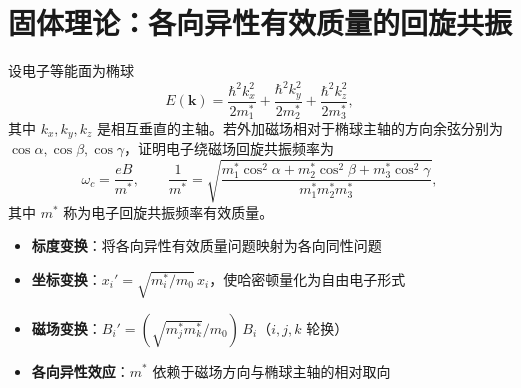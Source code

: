 \section{固体理论：各向异性有效质量的回旋共振}
\label{sec:anisotropic-cyclotron}

\begin{modelbox}[题目：椭球等能面的回旋共振有效质量]
设电子等能面为椭球
\[
E(\bm{k})=\frac{\hbar^2k_x^2}{2m_1^*}+\frac{\hbar^2k_y^2}{2m_2^*}+\frac{\hbar^2k_z^2}{2m_3^*},
\]
其中 $k_x,k_y,k_z$ 是相互垂直的主轴。若外加磁场相对于椭球主轴的方向余弦分别为 $\cos\alpha,\cos\beta,\cos\gamma$，证明电子绕磁场回旋共振频率为
\[
\omega_c=\frac{eB}{m^*},\qquad
\frac{1}{m^*}=\sqrt{\frac{m_1^*\cos^2\alpha+m_2^*\cos^2\beta+m_3^*\cos^2\gamma}{m_1^*m_2^*m_3^*}},
\]
其中 $m^*$ 称为电子回旋共振频率有效质量。
\end{modelbox}

\begin{tipbox}[考点快速分析]
\begin{itemize}
    \item \textbf{标度变换}：将各向异性有效质量问题映射为各向同性问题
    \item \textbf{坐标变换}：$x_i'=\sqrt{m_i^*/m_0}\,x_i$，使哈密顿量化为自由电子形式
    \item \textbf{磁场变换}：$B_i'=(\sqrt{m_j^*m_k^*}/m_0)\,B_i$（$i,j,k$ 轮换）
    \item \textbf{各向异性效应}：$m^*$ 依赖于磁场方向与椭球主轴的相对取向
\end{itemize}
\end{tipbox}

